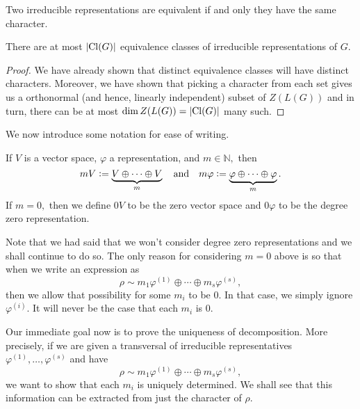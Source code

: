 \begin{thm} \label{thm:irredrepsequiviffsamechar}
	Two irreducible representations are equivalent if and only they have the same character.
\end{thm}

\begin{cor}
	There are at most ${\left\lvert \operatorname{Cl}(G) \right\lvert}$ equivalence classes of irreducible representations of $G.$
\end{cor}
\begin{proof} 
	We have already shown that distinct equivalence classes will have distinct characters. Moreover, we have shown that picking a character from each set gives us a orthonormal (and hence, linearly independent) subset of $Z(L(G))$ and in turn, there can be at most $\dim Z(L(G)) = {\left\lvert \operatorname{Cl}(G) \right\lvert}$ many such.
\end{proof}

We now introduce some notation for ease of writing.

\begin{defn}
	If $V$ is a vector space, $\varphi$ a representation, and $m \in \mathbb{N},$ then
	\begin{equation*} 
		mV \vcentcolon= \underbrace{V \oplus \cdots \oplus V}_{m} \quad\text{and}\quad m\varphi \vcentcolon= \underbrace{\varphi \oplus \cdots \oplus \varphi}_{m}.
	\end{equation*}
	If $m = 0,$ then we define $0V$ to be the zero vector space and $0\varphi$ to be the degree zero representation.
\end{defn}

\begin{rem}
	Note that we had said that we won't consider degree zero representations and we shall continue to do so. The only reason for considering $m = 0$ above is so that when we write an expression as
	\begin{equation*} 
		\rho \sim m_1\varphi^{(1)} \oplus \cdots \oplus m_s\varphi^{(s)},
	\end{equation*}
	then we allow that possibility for some $m_i$ to be $0.$ In that case, we simply ignore $\varphi^{(i)}.$ It will never be the case that each $m_i$ is $0.$
\end{rem}

Our immediate goal now is to prove the uniqueness of decomposition. More precisely, if we are given a transversal of irreducible representatives $\varphi^{(1)}, \ldots, \varphi^{(s)}$ and have
\begin{equation*} 
	\rho \sim m_1\varphi^{(1)} \oplus \cdots \oplus m_s \varphi^{(s)},
\end{equation*}
we want to show that each $m_i$ is uniquely determined. We shall see that this information can be extracted from just the character of $\rho.$


